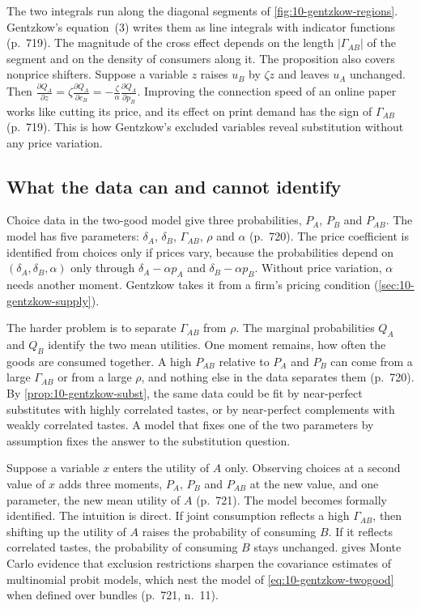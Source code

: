 The two integrals run along the diagonal segments of \cref{fig:10-gentzkow-regions}. Gentzkow's equation~(3) writes
them as line integrals with indicator functions (p.~719). The magnitude of the cross effect depends on the length
$|\Gamma_{AB}|$ of the segment and on the density of consumers along it. The proposition also covers nonprice shifters.
Suppose a variable $z$ raises $u_B$ by $\zeta z$ and leaves $u_A$ unchanged. Then $\frac{\partial Q_A}{\partial z} =
\zeta\frac{\partial Q_A}{\partial c_B} = -\frac{\zeta}{\alpha}\frac{\partial Q_A}{\partial p_B}$. Improving the
connection speed of an online paper works like cutting its price, and its effect on print demand has the sign of
$\Gamma_{AB}$ (p.~719). This is how Gentzkow's excluded variables reveal substitution without any price variation.

\subsection{What the data can and cannot identify}\label{sec:10-gentzkow-ident}

 Choice data in the two-good model give three probabilities, $P_A$, $P_B$ and $P_{AB}$.
The model has five parameters: $\delta_A$, $\delta_B$, $\Gamma_{AB}$, $\rho$ and $\alpha$ (p.~720). The price
coefficient is identified from choices only if prices vary, because the probabilities depend on $(\delta_A, \delta_B,
\alpha)$ only through $\delta_A - \alpha p_A$ and $\delta_B - \alpha p_B$. Without price variation, $\alpha$ needs
another moment. Gentzkow takes it from a firm's pricing condition (\cref{sec:10-gentzkow-supply}).

The harder problem is to separate $\Gamma_{AB}$ from $\rho$. The marginal probabilities $Q_A$ and $Q_B$ identify the two
mean utilities. One moment remains, how often the goods are consumed together. A high $P_{AB}$ relative to $P_A$ and
$P_B$ can come from a large $\Gamma_{AB}$ or from a large $\rho$, and nothing else in the data separates them
(p.~720). By \cref{prop:10-gentzkow-subst}, the same data could be fit by near-perfect substitutes with highly
correlated tastes, or by near-perfect complements with weakly correlated tastes. A model that fixes one of the two
parameters by assumption fixes the answer to the substitution question.

 Suppose a variable $x$ enters the utility of $A$ only. Observing choices at a second
value of $x$ adds three moments, $P_A$, $P_B$ and $P_{AB}$ at the new value, and one parameter, the new mean utility of
$A$ (p.~721). The model becomes formally identified. The intuition is direct. If joint consumption reflects a high
$\Gamma_{AB}$, then shifting up the utility of $A$ raises the probability of consuming $B$. If it reflects correlated
tastes, the probability of consuming $B$ stays unchanged. \citet{Keane1992} gives Monte Carlo evidence that exclusion
restrictions sharpen the covariance estimates of multinomial probit models, which nest the model of \eqref{eq:10-gentzkow-twogood}
when defined over bundles (p.~721, n.~11).

